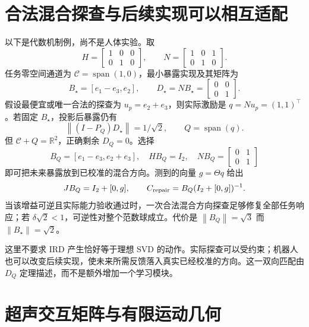 \documentclass[11pt,a4paper]{article}
\numberwithin{equation}{section}
\theoremstyle{definition}
\newcommand{\R}{\mathbb R}
\newcommand{\norm}[1]{\left\lVert#1\right\rVert}
\begin{document}
\section{合法混合探查与后续实现可以相互适配}
以下是代数机制例，尚不是人体实验。取
\begin{equation}
 H=\begin{bmatrix}1&0&0\\0&1&0\end{bmatrix},\qquad
 N=\begin{bmatrix}1&0&1\\0&1&0\end{bmatrix}.
\end{equation}
任务零空间通道为 $\mathcal C=\operatorname{span}(1,0)$，最小暴露实现及其矩阵为
\begin{equation}
 B_\star=[e_1-e_3,e_2],\qquad
 D_\star=NB_\star=\begin{bmatrix}0&0\\0&1\end{bmatrix}.
\end{equation}
假设最便宜或唯一合法的探查为 $u_p=e_2+e_3$，则实际激励是 $q=Nu_p=(1,1)^\top$。若固定 $B_\star$，投影后暴露仍有
\begin{equation}
 \norm{(I-P_Q)D_\star}=1/\sqrt2,
 \qquad Q=\operatorname{span}(q).
\end{equation}
但 $\mathcal C+Q=\R^2$，正确剩余 $D_Q=0$。选择
\begin{equation}
 B_Q=[e_1-e_3,e_2+e_3],\quad
 HB_Q=I_2,\quad NB_Q=\begin{bmatrix}0&1\\0&1\end{bmatrix}
\end{equation}
即可把未来暴露放到已校准的混合方向。测到的向量 $g=\Theta q$ 给出
\begin{equation}
 JB_Q=I_2+[0,g],\qquad
 C_{\rm repair}=B_Q(I_2+[0,g])^{-1}.
\end{equation}
当该增益可逆且实际能力验收通过时，一次合法混合方向探查足够修复全部任务响应；若 $\delta\sqrt2<1$，可逆性对整个范数球成立。代价是 $\norm{B_Q}=\sqrt3$ 而 $\norm{B_\star}=\sqrt2$。

这里不要求 IRD 产生恰好等于理想 SVD 的动作。实际探查可以受约束；机器人也可以改变后续实现，使未来所需反馈落入真实已经校准的方向。这一双向匹配由 $D_Q$ 定理描述，而不是额外增加一个学习模块。



\section{超声交互矩阵与有限运动几何}\label{sec:rev:ultrasound}
\end{document}
